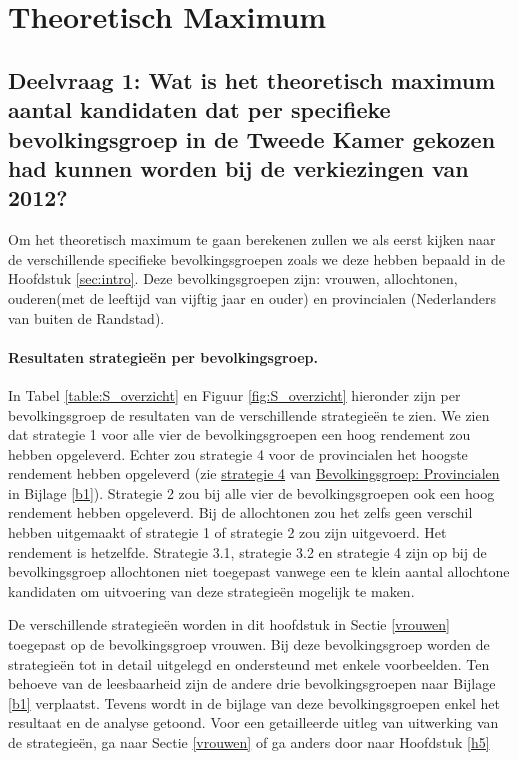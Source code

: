 \newpage
\section{Theoretisch Maximum}
\label{sec:eva}

\titlespacing*{\subsubsection}{0pt}{30pt}{10pt}


\subsection*{Deelvraag 1: Wat is het theoretisch maximum aantal kandidaten dat per specifieke bevolkingsgroep in de Tweede Kamer gekozen had kunnen worden bij de verkiezingen van 2012?}

Om het theoretisch maximum te gaan berekenen zullen we als eerst kijken naar de verschillende specifieke bevolkingsgroepen zoals we deze hebben bepaald in de Hoofdstuk \ref{sec:intro}. Deze bevolkingsgroepen zijn: vrouwen, allochtonen, ouderen(met de leeftijd van vijftig jaar en ouder) en provincialen (Nederlanders van buiten de Randstad). 


\paragraph*{Resultaten strategie\"{e}n per bevolkingsgroep.} 
In Tabel \ref{table:S_overzicht} en Figuur \ref{fig:S_overzicht} hieronder zijn per bevolkingsgroep de resultaten van de verschillende strategie\"{e}n te zien. We zien dat strategie 1 voor alle vier de bevolkingsgroepen een hoog rendement zou hebben opgeleverd. Echter zou strategie 4 voor de provincialen het hoogste rendement hebben opgeleverd (zie \hyperref[S4P]{strategie 4} van \hyperref[provincialen]{Bevolkingsgroep: Provincialen} in Bijlage \ref{b1}). Strategie 2 zou bij alle vier de bevolkingsgroepen ook een hoog rendement hebben opgeleverd. Bij de allochtonen zou het zelfs geen verschil hebben uitgemaakt of strategie 1 of strategie 2 zou zijn uitgevoerd. Het rendement is hetzelfde. Strategie 3.1, strategie 3.2 en strategie 4 zijn op bij de bevolkingsgroep allochtonen niet toegepast vanwege een te klein aantal allochtone kandidaten om uitvoering van deze strategie\"{e}n mogelijk te maken.  

De verschillende strategie\"{e}n worden in dit hoofdstuk in Sectie \ref{vrouwen} toegepast op de bevolkingsgroep vrouwen. Bij deze bevolkingsgroep worden de strategie\"{e}n tot in detail uitgelegd en ondersteund met enkele voorbeelden. Ten behoeve van de leesbaarheid zijn de andere drie bevolkingsgroepen naar Bijlage \ref{b1} verplaatst. Tevens wordt in de bijlage van deze bevolkingsgroepen enkel het resultaat en de analyse getoond. Voor een getailleerde uitleg van uitwerking van de strategie\"{e}n, ga naar Sectie \ref{vrouwen} of ga anders door naar Hoofdstuk \ref{h5}

